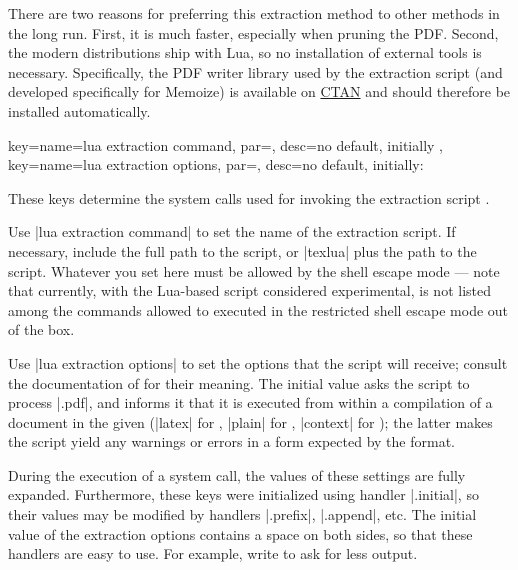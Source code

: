 \documentclass[a4paper,11pt]{article}
\begin{document}
There are two reasons for preferring this extraction method to other methods in
the long run.  First, it is much faster, especially when pruning the PDF.
Second, the modern  distributions ship with Lua, so no installation
of external tools is necessary.  Specifically, the PDF writer library
 used by the extraction script (and developed specifically for
Memoize) is available on \href{https://ctan.org/pkg/luapdfrw}{CTAN} and should
therefore be installed automatically.

\begin{doc}{
    key={name=lua extraction command, par=, desc={no
        default, initially }},
    key={name=lua extraction options, par=, desc={no default,
        initially: }} }
  
  These keys determine the system calls used for invoking the extraction
  script .

  Use |lua extraction command| to set the name of the extraction script.  If
  necessary, include the full path to the script, or |texlua| plus the path to
  the script.  Whatever you set here must be allowed by the shell escape mode
  --- note that currently, with the Lua-based script considered experimental,
   is not listed among the commands allowed to
  executed in the restricted shell escape mode out of the box.

  Use |lua extraction options| to set the options that the script will receive;
  consult the documentation of  for their
  meaning.  The initial value asks the script to process |.pdf|, and informs it that it is executed from within a 
  compilation of a document in the given  (|latex| for
  , |plain| for , |context| for
  ); the latter makes the script yield any warnings or errors
  in a form expected by the format.

  During the execution of a system call, the values of these settings are fully
  expanded.  Furthermore, these keys were initialized using 
  handler |.initial|, so their values may be modified by handlers |.prefix|,
  |.append|, etc.  The initial value of the extraction options contains a space
  on both sides, so that these handlers are easy to use.  For example, write
   to ask
  for less output.
\end{doc}
\end{document}
